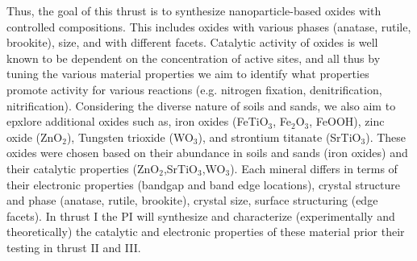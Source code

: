 Thus, the goal of this thrust is to synthesize nanoparticle-based oxides with controlled compositions. This includes oxides with various phases (anatase, rutile, brookite), size, and with different facets. Catalytic activity of oxides is well known to be dependent on the concentration of active sites, and all thus by tuning the various material properties we aim to identify what properties promote activity for various reactions (e.g. nitrogen fixation, denitrification, nitrification).  Considering the diverse nature of soils and sands, we also aim to epxlore additional oxides such as, iron oxides (FeTiO$_3$, Fe$_2$O$_3$, FeOOH), zinc oxide (ZnO$_2$), Tungsten trioxide (WO$_3$), and strontium titanate (SrTiO$_3$). These oxides were chosen based on their abundance in soils and sands (iron oxides) and their catalytic properties (ZnO$_2$,SrTiO$_3$,WO$_3$). Each mineral differs in terms of their electronic properties (bandgap and band edge locations), crystal structure and phase (anatase, rutile, brookite), crystal size, surface structuring (edge facets). In thrust I the PI will synthesize and characterize (experimentally and theoretically) the catalytic and electronic properties of these material prior their testing in thrust II and III.

